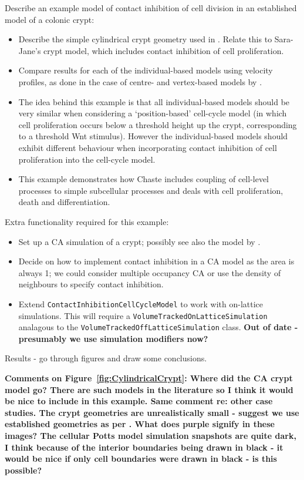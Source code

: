 \documentclass[12pt]{article}
\newcommand{\highlight}[1]{{\color{red} \bf{#1}}}
\begin{document}
\noindent Describe an example model of contact inhibition of cell division in an established model of a colonic crypt:
\begin{itemize}
\item Describe the simple cylindrical crypt geometry used in \citet{vanLeeuwen2009Integrative, Osborne2010Hybrid, Mirams2012Theoretical}. Relate this to Sara-Jane's crypt model, which includes contact inhibition of cell proliferation.
\item Compare results for each of the individual-based models using velocity profiles, as done in the case of centre- and vertex-based models by \citet{Osborne2010Hybrid}.
\item The idea behind this example is that all individual-based models should be very similar when considering a `position-based' cell-cycle model (in which cell proliferation occurs below a threshold height up the crypt, corresponding to a threshold Wnt stimulus). However the individual-based models should exhibit different behaviour when incorporating contact inhibition of cell proliferation into the cell-cycle model.
\item This example demonstrates how Chaste includes coupling of cell-level processes to simple subcellular processes and deals with cell proliferation, death and differentiation.
\end{itemize}

\noindent Extra functionality required for this example:
\begin{itemize}
\item Set up a CA simulation of a crypt; possibly see also the model by \citet{Paulus1992Model}. 
\item Decide on how to implement contact inhibition in a CA model as the area is always 1; we could consider multiple occupancy CA or use the density of neighbours to specify contact inhibition.
\item Extend \texttt{ContactInhibitionCellCycleModel} to work with on-lattice simulations. This will require a \texttt{VolumeTrackedOnLatticeSimulation} analagous to the \texttt{VolumeTrackedOffLatticeSimulation} class. 
\highlight{Out of date - presumably we use simulation modifiers now?}
\end{itemize}

\noindent Results - go through figures and draw some conclusions.

\highlight{Comments on Figure~\ref{fig:CylindricalCrypt}: 
Where did the CA crypt model go? There are such models in the literature so I think it would be nice to include in this example. 
Same comment re: other case studies. 
The crypt geometries are unrealistically small - suggest we use established geometries as per \citet{Mirams2012Theoretical}. 
What does purple signify in these images? 
The cellular Potts model simulation snapshots are quite dark, I think because of the interior boundaries being drawn in black - it would be nice if only cell boundaries were drawn in black - is this possible?
}
\end{document}
